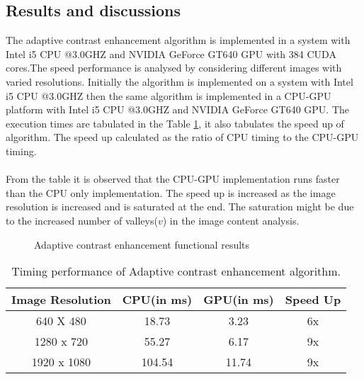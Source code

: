 \subsection{Results and discussions}
The adaptive contrast enhancement algorithm is implemented in a system with Intel i5 CPU @3.0GHZ and NVIDIA GeForce GT640 GPU with 384 CUDA cores.The speed performance is analysed by considering different images with varied resolutions. Initially the algorithm is implemented on a system with Intel i5 CPU @3.0GHZ then the same algorithm is implemented in a CPU-GPU platform with Intel i5 CPU @3.0GHZ and NVIDIA GeForce GT640 GPU. The execution times are tabulated in the Table \ref{timing of ace}, it also tabulates the speed up of algorithm. The speed up calculated as the ratio of CPU timing to the CPU-GPU timing.\paragraph*{} From the table it is observed that the CPU-GPU implementation runs faster than the CPU only implementation. The speed up is increased as the image resolution is increased and is saturated at the end. The saturation might be due to the increased number of valleys($v$) in the image content analysis. 

\begin{figure}[htb]
\centering
{}%
\qquad
{}%
\caption{Adaptive contrast enhancement functional results}%
\label{fig:ace results}%
\end{figure}
\begin{table}[htb]
\centering
\begin{tabular}{ |c|c|c|c| }
\hline
\textbf{Image Resolution} & \textbf{CPU(in ms)} &  \textbf{GPU(in ms)} & \textbf{Speed Up}\\
\hline
640 X 480 & 18.73 & 3.23 & 6x \\
\hline
1280 x 720 & 55.27 & 6.17 & 9x \\
\hline
1920 x 1080 & 104.54 & 11.74 & 9x \\
\hline
\end{tabular}
\caption{Timing performance of Adaptive contrast enhancement algorithm.}
\label{timing of ace}
\end{table}
